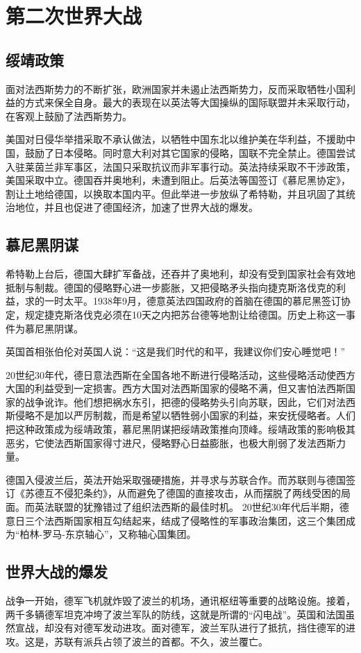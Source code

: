 \section{第二次世界大战}
\subsection{绥靖政策}
面对法西斯势力的不断扩张，欧洲国家并未遏止法西斯势力，反而采取牺牲小国利益的方式来保全自身。最大的表现在以英法等大国操纵的国际联盟并未采取行动，在客观上鼓励了法西斯势力。

美国对日侵华举措采取不承认做法，以牺牲中国东北以维护美在华利益，不援助中国，鼓励了日本侵略。同时意大利对其它国家的侵略，国联不完全禁止。德国尝试入驻莱茵兰非军事区，法国只采取抗议而非军事行动。英法持续采取不干涉政策，美国采取中立。德国吞并奥地利，未遭到阻止。后英法等国签订《慕尼黑协定》，割让土地给德国，以换取本国内平。但此举进一步放纵了希特勒，并且巩固了其统治地位，并且也促进了德国经济，加速了世界大战的爆发。

\subsection{慕尼黑阴谋}
希特勒上台后，德国大肆扩军备战，还吞并了奥地利，却没有受到国家社会有效地抵制与制裁。德国的侵略野心进一步膨胀，又把侵略矛头指向捷克斯洛伐克的利益，求的一时太平。1938年9月，德意英法四国政府的首脑在德国的慕尼黑签订协定，规定捷克斯洛伐克必须在10天之内把苏台德等地割让给德国。历史上称这一事件为慕尼黑阴谋。

英国首相张伯伦对英国人说：“这是我们时代的和平，我建议你们安心睡觉吧！”

20世纪30年代，德日意法西斯在全国各地不断进行侵略活动，这些侵略活动使西方大国的利益受到一定损害。西方大国对法西斯国家的侵略不满，但又害怕法西斯国家的战争讹诈。他们想把祸水东引，把德的侵略势头引向苏联，因此，它们对法西斯侵略不是加以严厉制裁，而是希望以牺牲弱小国家的利益，来安抚侵略者。人们把这种政策成为绥靖政策，慕尼黑阴谋把绥靖政策推向顶峰。绥靖政策的影响极其恶劣，它使法西斯国家得寸进尺，侵略野心日益膨胀，也极大削弱了发法西斯力量。

德国入侵波兰后，英法开始采取强硬措施，并寻求与苏联合作。而苏联则与德国签订《苏德互不侵犯条约》，从而避免了德国的直接攻击，从而摆脱了两线受困的局面。而英法联盟的犹豫错过了组织法西斯的最佳时机。
20世纪30年代后半期，德意日三个法西斯国家相互勾结起来，结成了侵略性的军事政治集团，这三个集团成为“柏林-罗马-东京轴心”，又称轴心国集团。

\subsection{世界大战的爆发}
战争一开始，德军飞机就炸毁了波兰的机场，通讯枢纽等重要的战略设施。接着，两千多辆德军坦克冲垮了波兰军队的防线，这就是所谓的“闪电战”。英国和法国虽然宣战，却没有对德军发动进攻。面对德军，波兰军队进行了抵抗，挡住德军的进攻。这是，苏联有派兵占领了波兰的首都。不久，波兰覆亡。

